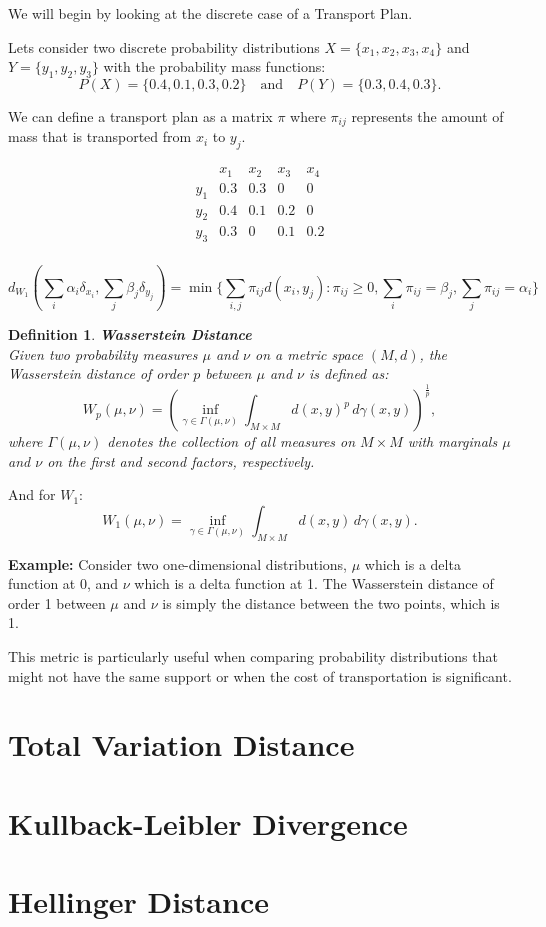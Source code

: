 \documentclass[11pt]{book}
\newtheorem{definition}{Definition}[section]
\begin{document}
We will begin by looking at the discrete case of a Transport Plan. 

Lets consider two discrete probability distributions \( X = \{x_1, x_2, x_3, x_4\} \) and \( Y = \{y_1, y_2, y_3\} \)
with the probability mass functions:
\[
    P(X) = \{0.4, 0.1, 0.3, 0.2\} \quad \text{and} \quad P(Y) = \{0.3, 0.4, 0.3\}.
\]

We can define a transport plan as a matrix \( \pi \) where \( \pi_{ij} \) represents the amount of mass that is transported from \( x_i \) to \( y_j \).


\[
\begin{array}{c|cccc}
  & x_1 & x_2 & x_3 & x_4 \\
\hline
y_1 & 0.3 & 0.3 & 0   & 0   \\
y_2 & 0.4 & 0.1 & 0.2 & 0   \\
y_3 & 0.3 & 0   & 0.1 & 0.2 \\
\end{array}
\]

\[
d_{W_1} \left( \sum_{i} \alpha_i \delta_{x_i}, \sum_{j} \beta_j \delta_{y_j} \right) = 
\min \{ \sum_{i,j} \pi_{ij} d(x_i, y_j) : \pi_{ij} \geq 0, 
\sum_{i} \pi_{ij} = \beta_j, \sum_{j} \pi_{ij} = \alpha_i \}
\]


\begin{definition}{\textbf{Wasserstein Distance}} \\
    Given two probability measures \( \mu \) and \( \nu \) on a metric space \( (M, d) \), the Wasserstein distance of order \( p \) between \( \mu \) and \( \nu \) is defined as:
    \[
    W_p(\mu, \nu) = \left( \inf_{\gamma \in \Gamma(\mu, \nu)} \int_{M \times M} d(x,y)^p \, d\gamma(x,y) \right)^{\frac{1}{p}},
    \]
    where \( \Gamma(\mu, \nu) \) denotes the collection of all measures on \( M \times M \) with marginals \( \mu \) and \( \nu \) on the first and second factors, respectively.
\end{definition}

And for $W_1$:
\[
    W_1(\mu, \nu) = \inf_{\gamma \in \Gamma(\mu, \nu)} \int_{M \times M} d(x,y) \, d\gamma(x,y).
\]


\textbf{Example:} Consider two one-dimensional distributions, \( \mu \) which is a delta function at 0, 
and \( \nu \) which is a delta function at 1. The Wasserstein distance of order 1 between \( \mu \) and \( \nu \) is simply the distance between the two points, which is 1.

This metric is particularly useful when comparing probability distributions that might not have the same support or when the cost of transportation is significant.


\section{Total Variation Distance}

\section{Kullback-Leibler Divergence}

\section{Hellinger Distance}
\end{document}
